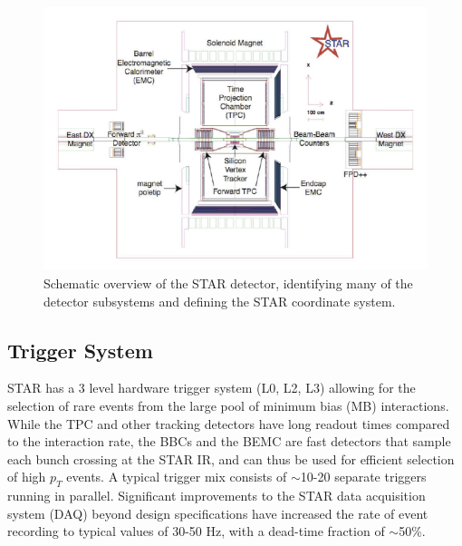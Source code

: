 \begin{figure}
  \includegraphics[width=1.0\textwidth]{figures/star-schematic}
  \caption{Schematic overview of the STAR detector, identifying many of the
  detector subsystems and defining the STAR coordinate system.}
  \label{fig:star-schematic}
\end{figure}

\subsection{Trigger System}

STAR has a 3 level hardware trigger system (L0, L2, L3) \cite{Bieser:2002ah,
Adler:2002ab} allowing for the selection of rare events from the large pool of
minimum bias (MB) interactions. While the TPC and other tracking detectors
have long readout times compared to the interaction rate, the BBCs and the
BEMC are fast detectors that sample each bunch crossing at the STAR IR, and
can thus be used for efficient selection of high $p_T$ events. A typical
trigger mix consists of $\sim$10-20 separate triggers running in parallel.
Significant improvements to the STAR data acquisition system (DAQ) beyond
design specifications have increased the rate of event recording to typical
values of 30-50 Hz, with a dead-time fraction of $\sim$50\%.

